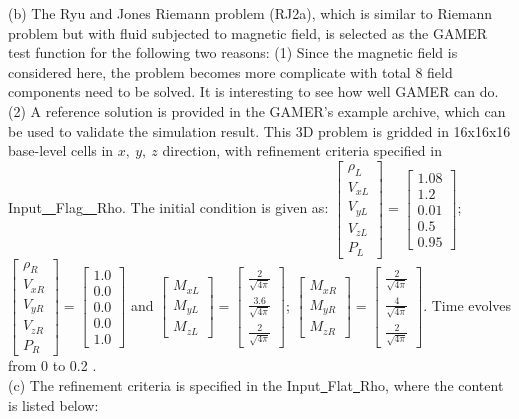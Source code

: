 \documentclass[a4paper,10pt]{article}
\begin{document}
\setlength{\parindent}{0em}(b) The Ryu and Jones Riemann problem (RJ2a), which is similar to Riemann problem but with fluid subjected to magnetic field, is selected as the GAMER test function for the following two reasons: (1) Since the magnetic field is considered here, the problem becomes more complicate with total 8 field components need to be solved. It is interesting to see how well GAMER can do.  (2) A reference solution is provided in the GAMER's example archive, which can be used to validate the simulation result. This 3D problem is gridded in 16x16x16 base-level cells in $x,\ y,\ z$ direction, with refinement criteria specified in Input\underline{\ \ }Flag\underline{\ \ }Rho. The initial condition is given as: $\begin{bmatrix*}\rho_L\\V_{xL}\\V_{yL}\\V_{zL}\\P_L\end{bmatrix*}=\begin{bmatrix*}1.08\\1.2\\0.01\\0.5\\0.95\end{bmatrix*}$; $\begin{bmatrix*}\rho_R\\V_{xR}\\V_{yR}\\V_{zR}\\P_R\end{bmatrix*}=\begin{bmatrix*}1.0\\0.0\\0.0\\0.0\\1.0\end{bmatrix*}$ and  $\begin{bmatrix*}M_{xL}\\M_{yL}\\M_{zL}\end{bmatrix*}=\begin{bmatrix*}\frac{2}{\sqrt{4\pi}}\\\frac{3.6}{\sqrt{4\pi}}\\\frac{2}{\sqrt{4\pi}}\end{bmatrix*}$; $\begin{bmatrix*}M_{xR}\\M_{yR}\\M_{zR}\end{bmatrix*}=\begin{bmatrix*}\frac{2}{\sqrt{4\pi}}\\\frac{4}{\sqrt{4\pi}}\\\frac{2}{\sqrt{4\pi}}\end{bmatrix*}$. Time evolves from 0 to 0.2 .\\
 \setlength{\parindent}{0em}(c) The refinement criteria is specified in the Input\underline{\ }Flat\underline{\ }Rho, where the content is listed below:
\end{document}
